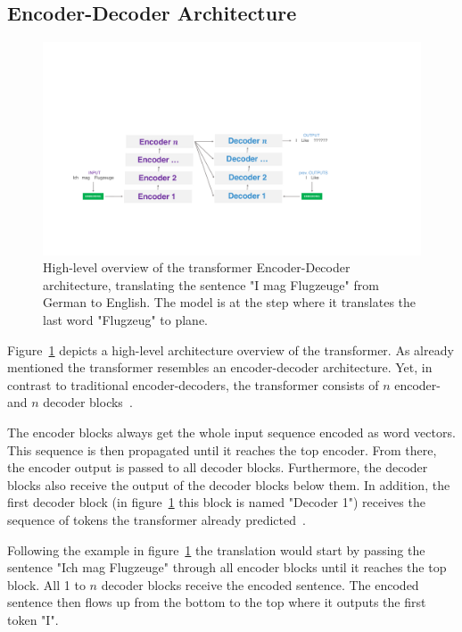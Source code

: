 \subsection{Encoder-Decoder Architecture}

\begin{figure}[htp]
    \centering
    \includegraphics[width=\textwidth]{figures/03_theory/03_transformer_Architecture_HighLevel}
    \caption{High-level overview of the transformer Encoder-Decoder architecture, translating the sentence "I mag Flugzeuge" from German to English. The model is at the step where it translates the last word "Flugzeug" to plane.}
    \label{fig:03_transformer_HighlevelOverview}
\end{figure}

Figure~\ref{fig:03_transformer_HighlevelOverview} depicts a high-level architecture overview of the transformer. As already mentioned the transformer resembles an encoder-decoder architecture. Yet, in contrast to traditional encoder-decoders, the transformer consists of $n$ encoder- and $n$ decoder blocks~\cite{Vaswani2017d}. 
\medskip

The encoder blocks always get the whole input sequence encoded as word vectors. This sequence is then propagated until it reaches the top encoder. From there, the encoder output is passed to all decoder blocks. Furthermore, the decoder blocks also receive the output of the decoder blocks below them. In addition, the first decoder block {(in figure~\ref{fig:03_transformer_HighlevelOverview} this block is named "Decoder 1")} receives the sequence of tokens the transformer already predicted~\cite{Vaswani2017d}. 
\medskip

Following the example in figure~\ref{fig:03_transformer_HighlevelOverview} the translation would start by passing the sentence "Ich mag Flugzeuge" through all encoder blocks until it reaches the top block. All 1 to $n$ decoder blocks receive the encoded sentence. The encoded sentence then flows up from the bottom to the top where it outputs the first token "I". 

